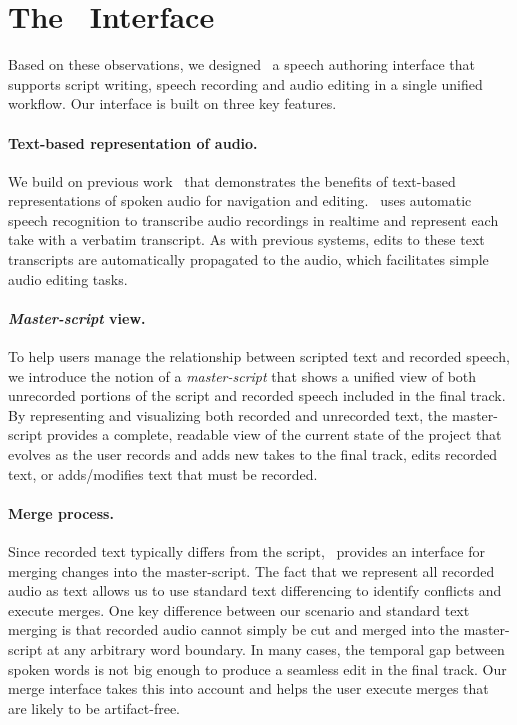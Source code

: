 \section{The \voicescript\  Interface}
Based on these observations, we designed \voicescript\, a speech authoring interface that supports script writing, speech recording and audio editing in a single unified workflow. Our interface is built on three key features.

\paragraph{Text-based representation of audio.} We build on previous work~\cite{casares2002simplifying,whittaker2004semantic,berthouzoz2012tools,rubin2013content} that demonstrates the benefits of text-based representations of spoken audio for navigation and editing. \voicescript\ uses automatic speech recognition to transcribe audio recordings in realtime and represent each take with a verbatim transcript. As with previous systems, edits to these text transcripts are automatically propagated to the audio, which facilitates simple audio editing tasks. 

\paragraph{\emph{Master-script} view.} To help users manage the relationship between scripted text and recorded speech, we introduce the notion of a \emph{master-script} that shows a unified view of both unrecorded portions of the script and recorded speech included in the final track. By representing and visualizing both recorded and unrecorded text, the master-script provides a complete, readable view of the current state of the project that evolves as the user records and adds new takes to the final track, edits recorded text, or adds/modifies text that must be recorded. 

\paragraph{Merge process.} Since recorded text typically differs from the script, \voicescript\ provides an interface for merging changes into the master-script. The fact that we represent all recorded audio as text allows us to use standard text differencing to identify conflicts and execute merges. One key difference between our scenario and standard text merging is that recorded audio cannot simply be cut and merged into the master-script at any arbitrary word boundary. In many cases, the temporal gap between spoken words is not big enough to produce a seamless edit in the final track. Our merge interface takes this into account and helps the user execute merges that are likely to be artifact-free.\\

